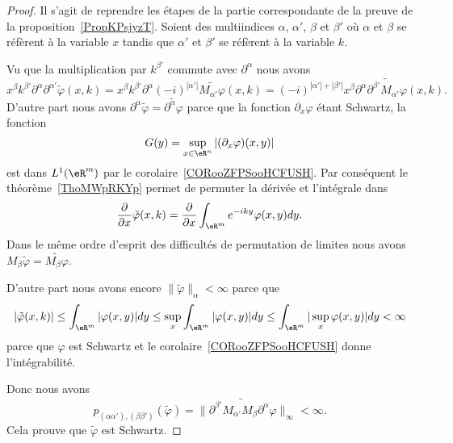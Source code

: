 \begin{proof}
	Il s'agit de reprendre les étapes de la partie correspondante de la preuve de la proposition~\ref{PropKPsjyzT}. Soient des multiindices \( \alpha\), \( \alpha'\), \( \beta\) et \( \beta'\) où \( \alpha\) et \( \beta\) se réfèrent à la variable \( x\) tandis que \( \alpha'\) et \( \beta'\) se réfèrent à la variable \( k\).

	Vu que la multiplication par \( k^{\beta'}\) commute avec \( \partial^{\alpha}\) nous avons
	\begin{equation}
		x^{\beta}k^{\beta'}\partial^{\alpha}\partial^{\alpha'}\tilde \varphi(x,k)=x^{\beta}k^{\beta'}\partial^{\alpha}(-i)^{| \alpha' |}\widetilde{M_{\alpha'}\varphi}(x,k)=(-i)^{| \alpha' |+| \beta' |}x^{\beta}\partial^{\alpha}\widetilde{    \partial^{\beta'}M_{\alpha'}\varphi  }(x,k).
	\end{equation}
	D'autre part nous avons \( \partial^{\alpha}\tilde \varphi=\widetilde{\partial^{\alpha}\varphi}\) parce que la fonction \( \partial_x\varphi\) étant Schwartz, la fonction
	\begin{equation}
		G(y)=\sup_{x\in \eR^n}|(\partial_x\varphi)(x,y)|
	\end{equation}
	est dans \( L^1(\eR^m)\) par le corolaire~\ref{CORooZFPSooHCFUSH}. Par conséquent le théorème~\ref{ThoMWpRKYp} permet de permuter la dérivée et l'intégrale dans
	\begin{equation}
		\frac{ \partial  }{ \partial x }\tilde \varphi(x,k)=\frac{ \partial  }{ \partial x }\int_{\eR^m} e^{-iky}\varphi(x,y)dy.
	\end{equation}
	Dans le même ordre d'esprit des difficultés de permutation de limites nous avons \( M_{\beta}\tilde \varphi=\widetilde{M_{\beta}\varphi}\).

	D'autre part nous avons encore \( \| \tilde \varphi \|_{\alpha}<\infty\) parce que
	\begin{equation}
		| \tilde \varphi(x,k) |\leq \int_{\eR^m}| \varphi(x,y) |dy\leq \sup_x\int_{\eR^m}| \varphi(x,y) |dy\leq \int_{\eR^m}| \sup_x\varphi(x,y) |dy<\infty
	\end{equation}
	parce que \( \varphi\) est Schwartz et le corolaire~\ref{CORooZFPSooHCFUSH} donne l'intégrabilité.

	Donc nous avons
	\begin{equation}
		p_{(\alpha\alpha'),(\beta\beta')}(\tilde \varphi)=\|  \widetilde{   \partial^{\beta'}M_{\alpha'}M_{\beta}\partial^{\alpha}\varphi      }    \|_{\infty}<\infty.
	\end{equation}
	Cela prouve que \( \tilde \varphi\) est Schwartz.
\end{proof}

